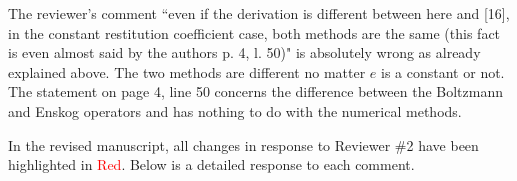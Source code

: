 \documentclass[11pt]{article}
\newcommand{\jh}[1]{\textcolor{red}{JH: #1}}
\newcommand{\mz}[1]{\textcolor{blue}{MZ: #1}}
\begin{document}

The reviewer's comment ``even if the derivation is different between here and [16], in the constant restitution coefficient case, both methods are the same (this fact is even almost said by the authors p. 4, l. 50)" is absolutely wrong as already explained above. The two methods are different no matter $e$ is a constant or not. The statement on page 4, line 50 concerns the difference between the Boltzmann and Enskog operators and has nothing to do with the numerical methods. 


\bigskip
In the revised manuscript, all changes in response to Reviewer \#2 have been highlighted in \textcolor{red}{Red}. Below is a detailed response to each comment.
\end{document}
